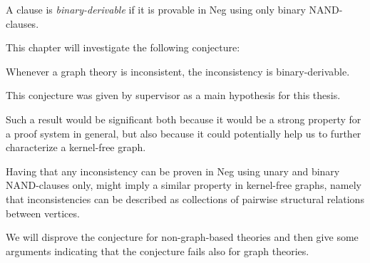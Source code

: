 \begin{definition}
  A clause is \textit{binary-derivable} if it is provable in Neg using only binary NAND-clauses.
\end{definition}
This chapter will investigate the following conjecture:
\begin{conjecture}
  Whenever a graph theory is inconsistent, the inconsistency is binary-derivable.
\end{conjecture}
This conjecture was given by supervisor as a main hypothesis for this thesis.

Such a result would be significant both because it would be a strong property for a proof system in general, but also because it could potentially help us to further characterize a kernel-free graph.

Having that any inconsistency can be proven in Neg using unary and binary NAND-clauses only, might imply a similar property in kernel-free graphs, namely that inconsistencies can be described as collections of pairwise structural relations between vertices.

We will disprove the conjecture for non-graph-based theories and then give some arguments indicating that the conjecture fails also for graph theories.
